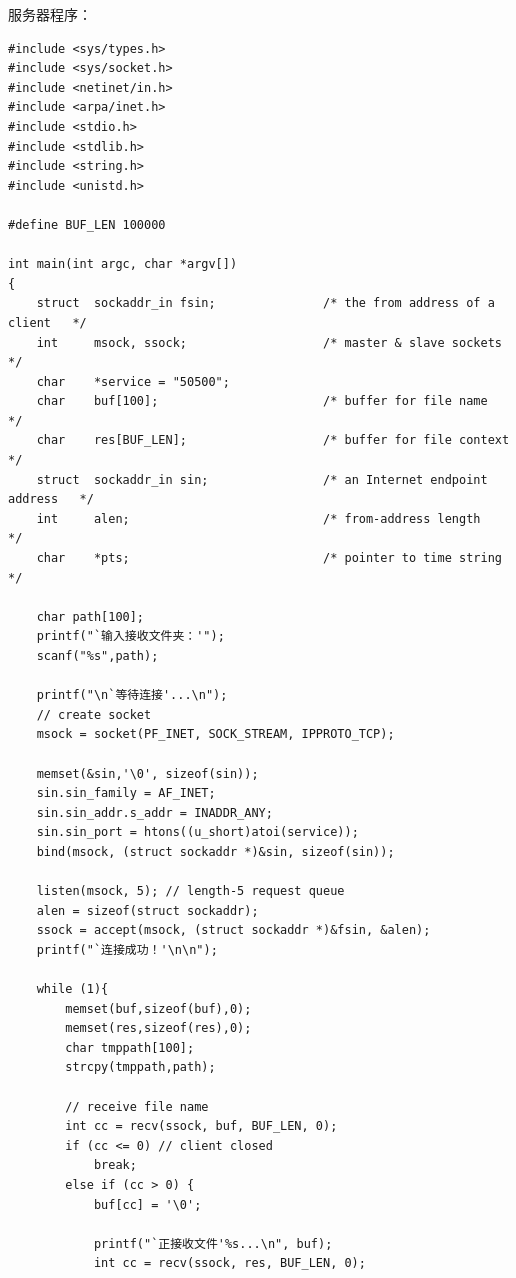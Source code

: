 \documentclass[logo,reportComp]{thesis}
\begin{document}
服务器程序：
\begin{lstlisting}
#include <sys/types.h>
#include <sys/socket.h>
#include <netinet/in.h>
#include <arpa/inet.h>
#include <stdio.h>
#include <stdlib.h>
#include <string.h>
#include <unistd.h>

#define BUF_LEN 100000

int main(int argc, char *argv[])
{
    struct  sockaddr_in fsin;               /* the from address of a client   */
    int     msock, ssock;                   /* master & slave sockets         */
    char    *service = "50500";
    char    buf[100];                       /* buffer for file name           */
    char    res[BUF_LEN];                   /* buffer for file context        */
    struct  sockaddr_in sin;                /* an Internet endpoint address   */
    int     alen;                           /* from-address length            */
    char    *pts;                           /* pointer to time string         */

    char path[100];
    printf("`输入接收文件夹：'");
    scanf("%s",path);

    printf("\n`等待连接'...\n");
    // create socket
    msock = socket(PF_INET, SOCK_STREAM, IPPROTO_TCP);

    memset(&sin,'\0', sizeof(sin));
    sin.sin_family = AF_INET;
    sin.sin_addr.s_addr = INADDR_ANY;
    sin.sin_port = htons((u_short)atoi(service));
    bind(msock, (struct sockaddr *)&sin, sizeof(sin));

    listen(msock, 5); // length-5 request queue
    alen = sizeof(struct sockaddr);
    ssock = accept(msock, (struct sockaddr *)&fsin, &alen);
    printf("`连接成功！'\n\n");

    while (1){
        memset(buf,sizeof(buf),0);
        memset(res,sizeof(res),0);
        char tmppath[100];
        strcpy(tmppath,path);

        // receive file name
        int cc = recv(ssock, buf, BUF_LEN, 0);
        if (cc <= 0) // client closed
            break;
        else if (cc > 0) {
            buf[cc] = '\0';

            printf("`正接收文件'%s...\n", buf);
            int cc = recv(ssock, res, BUF_LEN, 0);
            

\end{lstlisting}
\end{document}
